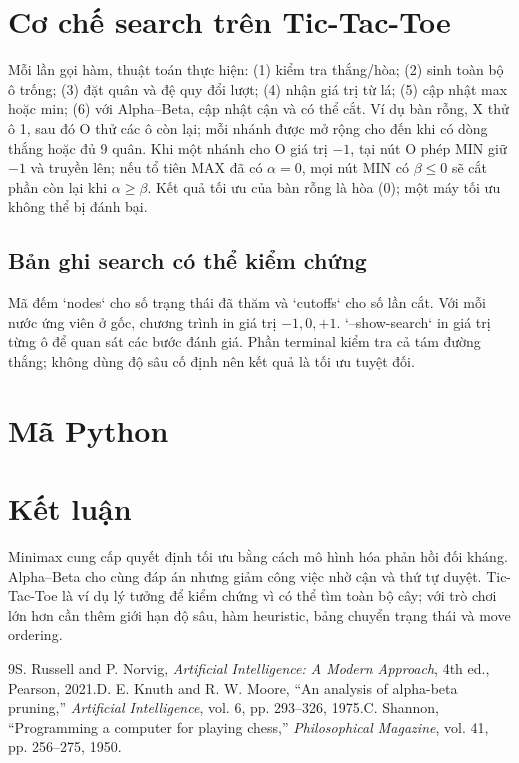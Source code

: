 \documentclass[conference]{IEEEtran}
\begin{document}
\section{Cơ chế search trên Tic-Tac-Toe}Mỗi lần gọi hàm, thuật toán thực hiện: (1) kiểm tra thắng/hòa; (2) sinh toàn bộ ô trống; (3) đặt quân và đệ quy đổi lượt; (4) nhận giá trị từ lá; (5) cập nhật max hoặc min; (6) với Alpha--Beta, cập nhật cận và có thể cắt. Ví dụ bàn rỗng, X thử ô 1, sau đó O thử các ô còn lại; mỗi nhánh được mở rộng cho đến khi có dòng thắng hoặc đủ 9 quân. Khi một nhánh cho O giá trị $-1$, tại nút O phép MIN giữ $-1$ và truyền lên; nếu tổ tiên MAX đã có $\alpha=0$, mọi nút MIN có $\beta\le0$ sẽ cắt phần còn lại khi $\alpha\ge\beta$. Kết quả tối ưu của bàn rỗng là hòa ($0$); một máy tối ưu không thể bị đánh bại.
\subsection{Bản ghi search có thể kiểm chứng}Mã đếm `nodes` cho số trạng thái đã thăm và `cutoffs` cho số lần cắt. Với mỗi nước ứng viên ở gốc, chương trình in giá trị $-1,0,+1$. `--show-search` in giá trị từng ô để quan sát các bước đánh giá. Phần terminal kiểm tra cả tám đường thắng; không dùng độ sâu cố định nên kết quả là tối ưu tuyệt đối.
\section{Mã Python}
\section{Kết luận}Minimax cung cấp quyết định tối ưu bằng cách mô hình hóa phản hồi đối kháng. Alpha--Beta cho cùng đáp án nhưng giảm công việc nhờ cận và thứ tự duyệt. Tic-Tac-Toe là ví dụ lý tưởng để kiểm chứng vì có thể tìm toàn bộ cây; với trò chơi lớn hơn cần thêm giới hạn độ sâu, hàm heuristic, bảng chuyển trạng thái và move ordering.
\begin{thebibliography}{9}S. Russell and P. Norvig, \emph{Artificial Intelligence: A Modern Approach}, 4th ed., Pearson, 2021.D. E. Knuth and R. W. Moore, ``An analysis of alpha-beta pruning,'' \emph{Artificial Intelligence}, vol. 6, pp. 293--326, 1975.C. Shannon, ``Programming a computer for playing chess,'' \emph{Philosophical Magazine}, vol. 41, pp. 256--275, 1950.\end{thebibliography}
\end{document}
